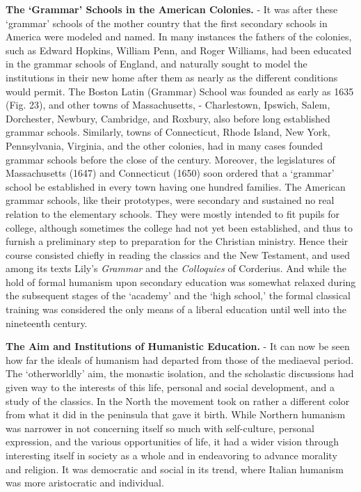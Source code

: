 \documentclass[]{book}
\begin{document}
\textbf{The `Grammar' Schools in the American Colonies.} - It was after these `grammar' schools of the mother country that the first secondary schools in America were modeled and named. In many instances the fathers of the colonies, such as Edward Hopkins, William Penn, and Roger Williams, had been educated in the grammar schools of England, and naturally sought to model the institutions in their new home after them as nearly as the different conditions would permit. The Boston Latin (Grammar) School was founded as early as 1635 (Fig. 23), and other towns of Massachusetts, - Charlestown, Ipswich, Salem, Dorchester, Newbury, Cambridge, and Roxbury, also before long established grammar schools. Similarly, towns of Connecticut, Rhode Island, New York, Pennsylvania, Virginia, and the other colonies, had in many cases founded grammar schools before the close of the century. Moreover, the legislatures of Massachusetts (1647) and Connecticut (1650) soon ordered that a `grammar' school be established in every town having one hundred families. The American grammar schools, like their prototypes, were secondary and sustained no real relation to the elementary schools. They were mostly intended to fit pupils for college, although sometimes the college had not yet been established, and thus to furnish a preliminary step to preparation for the Christian ministry. Hence their course consisted chiefly in reading the classics and the New Testament, and used among its texts Lily's \emph{Grammar} and the \emph{Colloquies} of Corderius. And while the hold of formal humanism upon secondary education was somewhat relaxed during the subsequent stages of the `academy' and the `high school,' the formal classical training was considered the only means of a liberal education until well into the nineteenth century.

\textbf{The Aim and Institutions of Humanistic Education.} - It can now be seen how far the ideals of humanism had departed from those of the mediaeval period. The `otherworldly' aim, the monastic isolation, and the scholastic discussions had given way to the interests of this life, personal and social development, and a study of the classics. In the North the movement took on rather a different color from what it did in the peninsula that gave it birth. While Northern humanism was narrower in not concerning itself so much with self-culture, personal expression, and the various opportunities of life, it had a wider vision through interesting itself in society as a whole and in endeavoring to advance morality and religion. It was democratic and social in its trend, where Italian humanism was more aristocratic and individual.
\end{document}
